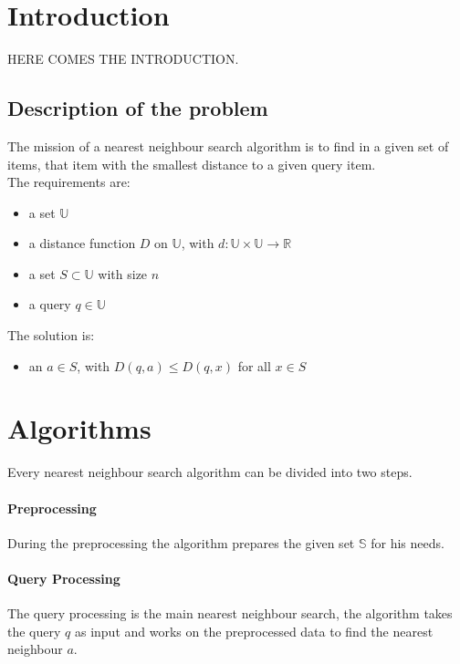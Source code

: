 \documentclass[runningheads,a4paper]{llncs}
\begin{document}
\tableofcontents
{}

\newpage
{}

\section{Introduction}

HERE COMES THE INTRODUCTION.

\subsection{Description of the problem}

The mission of a nearest neighbour search algorithm is to find in a given set of items, that item with the smallest
distance to a given query item.\\
The requirements are:
\begin{itemize}
	\item a set $\mathbb{U}$
	\item a distance function $D$ on $\mathbb{U}$, with $d: \mathbb{U} \times \mathbb{U} \to \mathbb{R}$
	\item a set $S \subset \mathbb{U}$ with size $n$
	\item a query $q \in \mathbb{U}$
\end{itemize}
The solution is:
\begin{itemize}
	\item an $a \in S$, with $D(q, a) \le D(q, x)$ for all $x \in S$
\end{itemize}

\section{Algorithms}

Every nearest neighbour search algorithm can be divided into two steps.
\paragraph{Preprocessing}
During the preprocessing the algorithm prepares the given set $\mathbb{S}$ for his needs.

\paragraph{Query Processing}
The query processing is the main nearest neighbour search, the algorithm takes the query $q$ as input and works on the
preprocessed data to find the nearest neighbour $a$.\\
\end{document}
